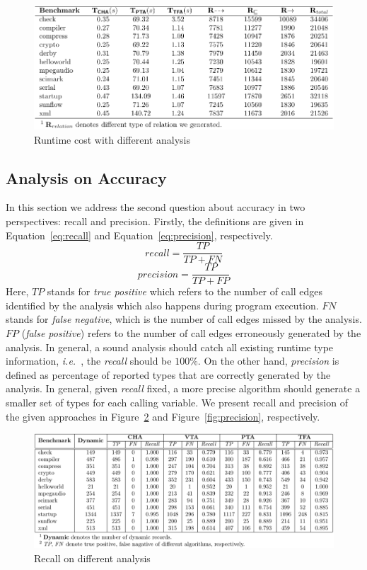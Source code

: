 \documentclass{fac}
\newcommand\ie{\textit{i.e.\ }}
\begin{document}
\begin{figure}
\centering
\includegraphics[scale=1]{timecost.pdf}
\caption{Runtime cost with different analysis}
\label{fig:TimeCost}
\end{figure}

\subsection{Analysis on Accuracy}\label{subsec:accuracy}

In this section we address the second question about accuracy in two perspectives: recall and precision. Firstly, the definitions are given in Equation~\ref{eq:recall} and Equation~\ref{eq:precision}, respectively.
\begin{equation}\label{eq:recall}
recall = \dfrac{TP}{TP+FN}
\end{equation}
\begin{equation}\label{eq:precision}
precision =  \dfrac{TP}{TP+FP}
\end{equation}
Here, $TP$ stands for \emph{true positive} which refers to the number of call edges identified by the analysis which also happens during program execution. $FN$ stands for \emph{false negative}, which is the number of call edges missed by the analysis. $FP$ (\emph{false positive}) refers to the number of call edges erroneously generated by the analysis. In general, a sound analysis should catch all existing runtime type information, \ie, the \emph{recall} should be $100\%$. On the other hand, \emph{precision} is defined as percentage of reported types that are correctly generated by the analysis. In general, given \emph{recall} fixed, a more precise algorithm should generate a smaller set of types for each calling variable. %
We present recall and precision of the given approaches in Figure~\ref{fig:recall} and Figure~\ref{fig:precision}, respectively.


\begin{figure}\centering
\includegraphics[scale=0.9]{recall-lib.pdf}
\caption{Recall on different analysis}
\label{fig:recall}
\end{figure}
\end{document}

